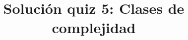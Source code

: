 \documentclass{doc}
\title{Solución quiz 5: Clases de complejidad}
\begin{document}
\makedocheader
\soluciontrue

\end{document}

